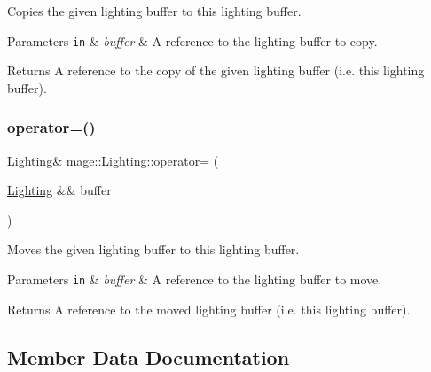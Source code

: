 Copies the given lighting buffer to this lighting buffer.


\begin{DoxyParams}[1]{Parameters}
\mbox{\tt in}  & {\em buffer} & A reference to the lighting buffer to copy. \\
\hline
\end{DoxyParams}
\begin{DoxyReturn}{Returns}
A reference to the copy of the given lighting buffer (i.\+e. this lighting buffer). 
\end{DoxyReturn}
\hypertarget{structmage_1_1_lighting_adf7079d86353561a08e1729932d5e9e2}{}\label{structmage_1_1_lighting_adf7079d86353561a08e1729932d5e9e2} 
\subsubsection{\texorpdfstring{operator=()}{operator=()}\hspace{0.1cm}{\footnotesize\ttfamily [2/2]}}
{\footnotesize\ttfamily \hyperlink{structmage_1_1_lighting}{Lighting}\& mage\+::\+Lighting\+::operator= (\begin{DoxyParamCaption}\item[{\hyperlink{structmage_1_1_lighting}{Lighting} \&\&}]{buffer }\end{DoxyParamCaption})\hspace{0.3cm}{\ttfamily [default]}}

Moves the given lighting buffer to this lighting buffer.


\begin{DoxyParams}[1]{Parameters}
\mbox{\tt in}  & {\em buffer} & A reference to the lighting buffer to move. \\
\hline
\end{DoxyParams}
\begin{DoxyReturn}{Returns}
A reference to the moved lighting buffer (i.\+e. this lighting buffer). 
\end{DoxyReturn}


\subsection{Member Data Documentation}
\hypertarget{structmage_1_1_lighting_a86b0b11255b340aefd2826e4ce20e62e}{}\label{structmage_1_1_lighting_a86b0b11255b340aefd2826e4ce20e62e} 
